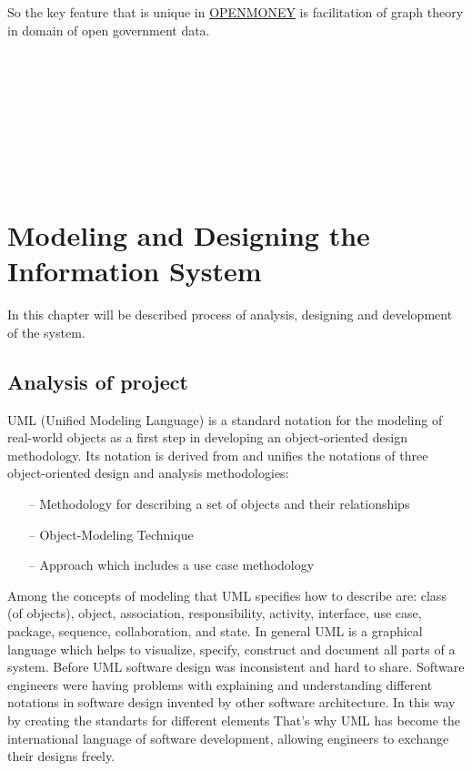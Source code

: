 \documentclass[12pt,a4paper,titlepage]{article}
\begin{document}
 So the key feature that is unique in \underline{OPENMONEY} is facilitation of graph theory in domain of open government data.\\\\\\\\\\\\\\\\\\


	\newpage
\newpage
\section{Modeling and Designing the Information System}

In this chapter will be described process of analysis, designing and development of the system.

\subsection{Analysis of project}
UML (Unified Modeling Language) is a standard notation for the modeling of real-world objects
as a first step in developing an object-oriented design methodology. Its notation is derived from and
unifies the notations of three object-oriented design and analysis methodologies:

\begin{itemize}
\item[--] Methodology for describing a set of objects and their relationships
\item[--] Object-Modeling Technique
\item[--] Approach which includes a use case methodology
\end{itemize}

Among the concepts of modeling that UML specifies how to describe are: class (of objects),
object, association, responsibility, activity, interface, use case, package, sequence, collaboration, and
state. In general UML is a graphical language which helps to visualize, specify, construct and
document all parts of a system. Before UML software design was inconsistent and hard to share.
Software engineers were having problems with explaining and understanding different notations in
software design invented by other software architecture. In this way by creating the standarts for
different elements That’s why UML has become the international language of software development,
allowing engineers to exchange their designs freely.\\
\end{document}

